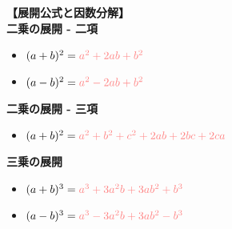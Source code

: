 \documentclass{article}
\begin{document}
\textbf{【展開公式と因数分解】}\\
\textbf{二乗の展開 - 二項}
\begin{itemize}
        \item \((a + b)^2 = \textcolor[rgb]{1,0.5,0.5}{a^2 + 2ab + b^2}\)
        \item \((a - b)^2 = \textcolor[rgb]{1,0.5,0.5}{a^2 - 2ab + b^2}\)
\end{itemize}
\textbf{二乗の展開 - 三項}
\begin{itemize}
        \item \((a + b)^2 = \textcolor[rgb]{1,0.5,0.5}{a^2 + b^2 + c^2 + 2ab + 2bc + 2ca}\)
\end{itemize}
\textbf{三乗の展開}
\begin{itemize}
        \item \((a + b)^3 = \textcolor[rgb]{1,0.5,0.5}{a^3 + 3a^2b + 3ab^2 + b^3}\)
        \item \((a - b)^3 = \textcolor[rgb]{1,0.5,0.5}{a^3 - 3a^2b + 3ab^2 - b^3}\)
\end{itemize}
\end{document}
